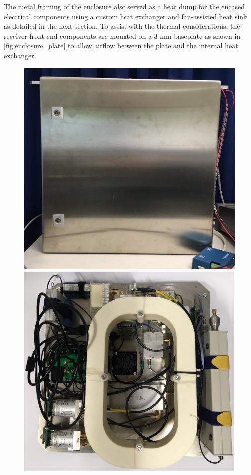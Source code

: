 The metal framing of the enclosure also served as a heat dump for the encased electrical components using a custom heat exchanger and fan-assisted heat sink as detailed in the next section. To assist with the thermal considerations, the receiver front-end components are mounted on a 3 mm baseplate as shown in \cref{fig:enclosure_plate} to allow airflow between the plate and the internal heat exchanger.
\begin{figure}
    \centering
    \begin{minipage}{.4\textwidth}
        \includegraphics[scale=0.55]{enclosure}
        \vfill
        \includegraphics[scale=0.55]{component_plate}

\end{minipage}
\end{figure}
